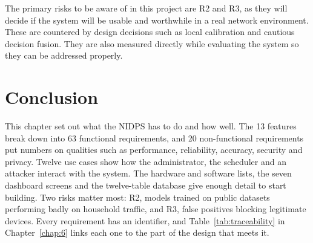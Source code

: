 \noindent The primary risks to be aware of in this project are R2 and R3, as they will decide if the system will be usable and worthwhile in a real network environment. These are countered by design decisions such as local calibration and cautious decision fusion. They are also measured directly while evaluating the system so they can be addressed properly.

\section{Conclusion}\label{sec:4.11}

\noindent This chapter set out what the NIDPS has to do and how well. The 13 features break down into 63 functional requirements, and 20 non-functional requirements put numbers on qualities such as performance, reliability, accuracy, security and privacy. Twelve use cases show how the administrator, the scheduler and an attacker interact with the system. The hardware and software lists, the seven dashboard screens and the twelve-table database give enough detail to start building. Two risks matter most: R2, models trained on public datasets performing badly on household traffic, and R3, false positives blocking legitimate devices. Every requirement has an identifier, and Table~\ref{tab:traceability} in Chapter~\ref{chap:6} links each one to the part of the design that meets it.
